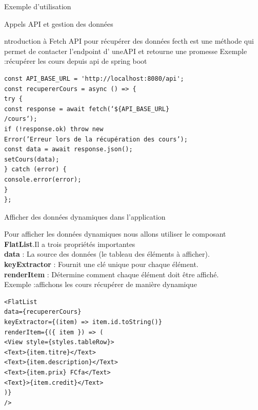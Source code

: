 \documentclass[5pt]{beamer}
\begin{document}
{\begin{frame}[fragile]{ Exemple d'utilisation}
\end{frame}
\begin{frame}[fragile]{Appels API et gestion des données}
\begin{block}{ntroduction à Fetch API pour récupérer des données}
fecth est une méthode qui permet de contacter l’endpoint d’ uneAPI et retourne une promesse
Exemple :récupérer les cours depuis api de spring boot
\begin{verbatim}
const API_BASE_URL = 'http://localhost:8080/api';
const recupererCours = async () => {
try {
const response = await fetch(‘${API_BASE_URL}
/cours‘);
if (!response.ok) throw new
Error(’Erreur lors de la récupération des cours’);
const data = await response.json();
setCours(data);
} catch (error) {
console.error(error);
}
};
\end{verbatim}
\end{block}
\end{frame}
\begin{frame}[fragile]{ Afficher des données dynamiques dans l’application}
\begin{block}{ }
Pour afficher les données dynamiques nous allons utiliser le
composant \textbf{FlatList}.Il a trois propriétés importantes\\
\textbf{data} : La source des données (le tableau des éléments à
afficher).\\
\textbf{keyExtractor} : Fournit une clé unique pour chaque élément.\\
\textbf{renderItem} : Détermine comment chaque élément doit être
affiché.\\
Exemple :affichons les cours récupérer de manière dynamique
\begin{verbatim}
<FlatList
data={recupererCours}
keyExtractor={(item) => item.id.toString()}
renderItem={({ item }) => (
<View style={styles.tableRow}>
<Text>{item.titre}</Text>
<Text>{item.description}</Text>
<Text>{item.prix} FCfa</Text>
<Text}>{item.credit}</Text>
)}
/>
\end{verbatim}
\end{block}

\end{frame}
}
\end{document}

